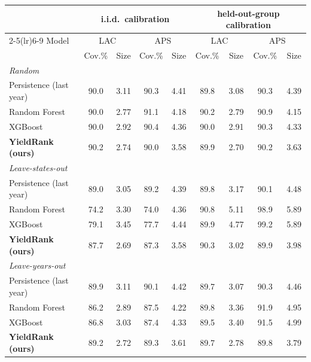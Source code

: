 \begin{tabular}{lcccccccc}
\toprule
 & \multicolumn{4}{c}{i.i.d.\ calibration} & \multicolumn{4}{c}{held-out-group calibration} \\
\cmidrule(lr){2-5}\cmidrule(lr){6-9}
Model & \multicolumn{2}{c}{LAC} & \multicolumn{2}{c}{APS} & \multicolumn{2}{c}{LAC} & \multicolumn{2}{c}{APS} \\
 & Cov.\% & Size & Cov.\% & Size & Cov.\% & Size & Cov.\% & Size \\
\midrule
\multicolumn{9}{l}{\emph{Random}} \\
Persistence (last year) & 90.0 & 3.11 & 90.3 & 4.41 & 89.8 & 3.08 & 90.3 & 4.39 \\
Random Forest~\cite{kulkarni2018,breiman2001} & 90.0 & 2.77 & 91.1 & 4.18 & 90.2 & 2.79 & 90.9 & 4.15 \\
XGBoost~\cite{dey2024,chen2016} & 90.0 & 2.92 & 90.4 & 4.36 & 90.0 & 2.91 & 90.3 & 4.33 \\
\textbf{YieldRank (ours)} & 90.2 & 2.74 & 90.0 & 3.58 & 89.9 & 2.70 & 90.2 & 3.63 \\
\multicolumn{9}{l}{\emph{Leave-states-out}} \\
Persistence (last year) & 89.0 & 3.05 & 89.2 & 4.39 & 89.8 & 3.17 & 90.1 & 4.48 \\
Random Forest~\cite{kulkarni2018,breiman2001} & 74.2 & 3.30 & 74.0 & 4.36 & 90.8 & 5.11 & 98.9 & 5.89 \\
XGBoost~\cite{dey2024,chen2016} & 79.1 & 3.45 & 77.7 & 4.44 & 89.9 & 4.77 & 99.2 & 5.89 \\
\textbf{YieldRank (ours)} & 87.7 & 2.69 & 87.3 & 3.58 & 90.3 & 3.02 & 89.9 & 3.98 \\
\multicolumn{9}{l}{\emph{Leave-years-out}} \\
Persistence (last year) & 89.9 & 3.11 & 90.1 & 4.42 & 89.7 & 3.07 & 90.3 & 4.46 \\
Random Forest~\cite{kulkarni2018,breiman2001} & 86.2 & 2.89 & 87.5 & 4.22 & 89.8 & 3.36 & 91.9 & 4.95 \\
XGBoost~\cite{dey2024,chen2016} & 86.8 & 3.03 & 87.4 & 4.33 & 89.5 & 3.40 & 91.5 & 4.99 \\
\textbf{YieldRank (ours)} & 89.2 & 2.72 & 89.3 & 3.61 & 89.7 & 2.78 & 89.8 & 3.79 \\
\bottomrule
\end{tabular}
